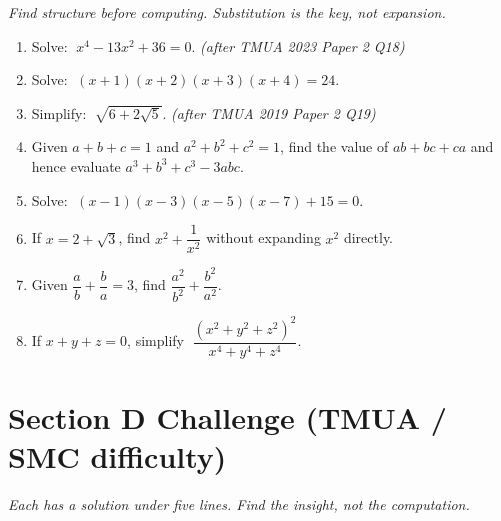 \documentclass[11pt,a4paper]{article}
\begin{document}
\noindent\textit{Find structure before computing. Substitution is the key, not expansion.}

\begin{enumerate}

\item Solve: $\;x^4-13x^2+36=0$. \textit{\small(after TMUA 2023 Paper 2 Q18)}

\item Solve: $\;(x+1)(x+2)(x+3)(x+4)=24$.

\item Simplify: $\;\sqrt{6+2\sqrt{5}}$. \textit{\small(after TMUA 2019 Paper 2 Q19)}

\item Given $a+b+c=1$ and $a^2+b^2+c^2=1$, find the value of $ab+bc+ca$
      and hence evaluate $a^3+b^3+c^3-3abc$.

\item Solve: $\;(x-1)(x-3)(x-5)(x-7)+15=0$.

\item If $x=2+\sqrt{3}$, find $x^2+\dfrac{1}{x^2}$ without expanding $x^2$ directly.

\item Given $\dfrac{a}{b}+\dfrac{b}{a}=3$, find $\dfrac{a^2}{b^2}+\dfrac{b^2}{a^2}$.

\item If $x+y+z=0$, simplify $\;\dfrac{(x^2+y^2+z^2)^2}{x^4+y^4+z^4}$.

\end{enumerate}

\section*{Section D \quad Challenge \hfill{\normalfont\small(TMUA / SMC difficulty)}}

\noindent\textit{Each has a solution under five lines. Find the insight, not the computation.}
\end{document}
